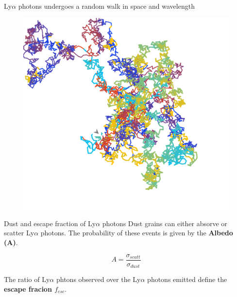 \documentclass{beamer}
\begin{document}
\begin{frame}{Ly$\alpha$ photons undergoes a random walk in space and wavelength}
\begin{figure}
\includegraphics[scale=0.4]{Figures/rand_walk.png}
\end{figure}
\end{frame}

\begin{frame}{Dust and escape fraction of Ly$\alpha$ photons}
Dust grains can either absorve or scatter Ly$\alpha$ photons. The probability
of these events is given by the \textbf{Albedo (A)}.

\[   
A = \dfrac{\sigma_{scatt}}{\sigma_{dust}}
\]

The ratio of Ly$\alpha$ phtons observed over the Ly$\alpha$ photons emitted
define the \textbf{escape fracion $f_{esc}$}.
 
\end{frame}
\end{document}
